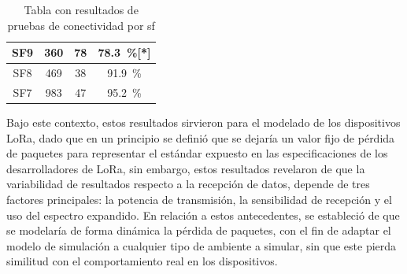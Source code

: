 \begin{justify}
\begin{table}[!ht]
\begin{tabular}{|c|c|c|c|}
SF9 & 360 & 78 & \SI{78.3}{\percent}[*]\\
\hline
SF8 & 469 & 38 & \SI{91.9}{\percent}\\
\hline
SF7 & 983 & 47 & \SI{95.2}{\percent}\\
\hline
\end{tabular}
\caption{Tabla con resultados de pruebas de conectividad por \gls{sf}}
\label{prueba:real}
\end{table}
\newpage \noindent
Bajo este contexto, estos resultados sirvieron para el modelado de los dispositivos LoRa, dado que en un principio se definió que se dejaría un valor fijo de pérdida de paquetes para representar el estándar expuesto en las especificaciones de los desarrolladores de LoRa, sin embargo, estos resultados revelaron de que la variabilidad de resultados respecto a la recepción de datos, depende de tres factores principales: la potencia de transmisión, la sensibilidad de recepción y el uso del espectro expandido. En relación a estos antecedentes, se estableció de que se modelaría de forma dinámica la pérdida de paquetes, con el fin de adaptar el modelo de simulación a cualquier tipo de ambiente a simular, sin que este pierda similitud con el comportamiento real en los dispositivos.

\end{justify}
